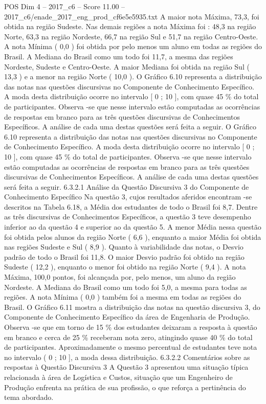 \begin{textsample}{POS Dim 4 – 2017\_c6 – Score 11.00 – 2017\_c6/enade\_2017\_eng\_prod\_cf6e5e5935.txt}
A maior nota Máxima, 73,3, foi obtida na região Sudeste.
Nas demais regiões a nota Máxima foi : 48,3 na região Norte, 63,3 na região Nordeste, 66,7 na região Sul e 51,7 na região Centro-Oeste.
A nota Mínima ( 0,0 ) foi obtida por pelo menos um aluno em todas as regiões do Brasil.
A Mediana do Brasil como um todo foi 11,7, a mesma das regiões Nordeste, Sudeste e Centro-Oeste.
A maior Mediana foi obtida na região Sul ( 13,3 ) e a menor na região Norte ( 10,0 ).
O Gráfico 6.10 representa a distribuição das notas nas questões discursivas no Componente de Conhecimento Específico.
A moda desta distribuição ocorre no intervalo [ 0 ; 10 ], com quase 45 \% do total de participantes.
Observa -se que nesse intervalo estão computadas as ocorrências de respostas em branco para as três questões discursivas de Conhecimentos Específicos.
A análise de cada uma destas questões será feita a seguir.
O Gráfico 6.10 representa a distribuição das notas nas questões discursivas no Componente de Conhecimento Específico.
A moda desta distribuição ocorre no intervalo [ 0 ; 10 ], com quase 45 \% do total de participantes.
Observa -se que nesse intervalo estão computadas as ocorrências de respostas em branco para as três questões discursivas de Conhecimentos Específicos.
A análise de cada uma destas questões será feita a seguir. 6.3.2.1 Análise da Questão Discursiva 3 do Componente de Conhecimento Específico Na questão 3, cujos resultados aferidos encontram -se descritos na Tabela 6.18, a Média dos estudantes de todo o Brasil foi 8,7.
Dentre as três discursivas de Conhecimentos Específicos, a questão 3 teve desempenho inferior ao da questão 4 e superior ao da questão 5.
A menor Média nessa questão foi obtida pelos alunos da região Norte ( 6,6 ), enquanto a maior Média foi obtida nas regiões Sudeste e Sul ( 8,9 ).
Quanto à variabilidade das notas, o Desvio padrão de todo o Brasil foi 11,8.
O maior Desvio padrão foi obtido na região Sudeste ( 12,2 ), enquanto o menor foi obtido na região Norte ( 9,4 ).
A nota Máxima, 100,0 pontos, foi alcançada por, pelo menos, um aluno da região Nordeste.
A Mediana do Brasil como um todo foi 5,0, a mesma para todas as regiões.
A nota Mínima ( 0,0 ) também foi a mesma em todas as regiões do Brasil.
O Gráfico 6.11 mostra a distribuição das notas na questão discursiva 3, do Componente de Conhecimento Específico da área de Engenharia de Produção.
Observa -se que em torno de 15 \% dos estudantes deixaram a resposta à questão em branco e cerca de 25 \% receberam nota zero, atingindo quase 40 \% do total de participantes.
Aproximadamente o mesmo percentual de estudantes teve nota no intervalo ( 0 ; 10 ], a moda dessa distribuição. 6.3.2.2 Comentários sobre as respostas à Questão Discursiva 3 A Questão 3 apresentou uma situação típica relacionada à área de Logística e Custos, situação que um Engenheiro de Produção enfrenta na prática de sua profissão, o que reforça a pertinência do tema abordado.

\end{textsample}
